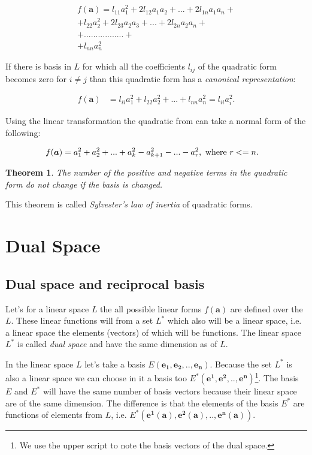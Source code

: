 \documentclass{book}
\newtheorem{theorem}{Theorem}
\begin{document}
\begin{align*}
f(\boldsymbol{a}) = l_{11}a_{1}^2 + 2l_{12}a_1a_2 + ... + 2l_{1n}a_1a_n + \\
+ l_{22}a_{2}^2 + 2l_{23}a_2a_3 + ... + 2l_{2n}a_2a_n + \\
+ ................. + \\
+ l_{nn}a_{n}^2
\end{align*}

If there is basis in $L$ for which all the coefficients $l_{ij}$ of the quadratic form becomes zero for $i \neq j$ than this quadratic form has a \emph{canonical representation}:

\begin{align}
    f(\boldsymbol{a}) &= l_{ii}a_{1}^2 + l_{22}a_{2}^2 + ... + l_{nn}a_{n}^2 = l_{ii}a_{i}^2.
\end{align}

Using the linear transformation the quadratic from can take a normal form of the following:

\begin{align}
    f(\boldsymbol{a}) &= a_{1}^2 + a_{2}^2 + ... + a_{k}^2 - a_{k+1}^2 - ... - a_{r}^2, \textnormal{ where } r <= n.  
\end{align}

\begin{theorem}
The number of the positive and negative terms in the quadratic form do not change if the basis is changed.
\end{theorem}

This theorem is called  \emph{Sylvester's law of inertia} of quadratic forms.

\chapter{Dual Space}

\section{Dual space and reciprocal basis}

Let's for a linear space $L$ the all possible linear forms $f(\boldsymbol{a})$ are defined over the $L$. These linear functions will from a set $L^*$ which also will be a linear space, i.e. a linear space the elements (vectors) of which will be functions. The linear space $L^*$ is called \emph{dual space} and have the same dimension as of $L$.

In the linear space $L$ let's take a basis $E(\boldsymbol{e_1}, \boldsymbol{e_2}, .., \boldsymbol{e_n})$. Because the set $L^*$ is also a linear space we can choose in it a basis too $E^{*}(\boldsymbol{e^{1}}, \boldsymbol{e^{2}}, .., \boldsymbol{e^{n}})$\footnote{We use the upper script to note the basis vectors of the dual space.}. The basis $E$ and $E^{*}$ will have the same number of basis vectors because their linear space are of the same dimension. The difference is that the elements of the basis $E^*$ are functions of elements from $L$, i.e. $E^{*}(\boldsymbol{e^{1}}(\boldsymbol{a}), \boldsymbol{e^{2}}(\boldsymbol{a}), .., \boldsymbol{e^{n}}(\boldsymbol{a}))$.
\end{document}
